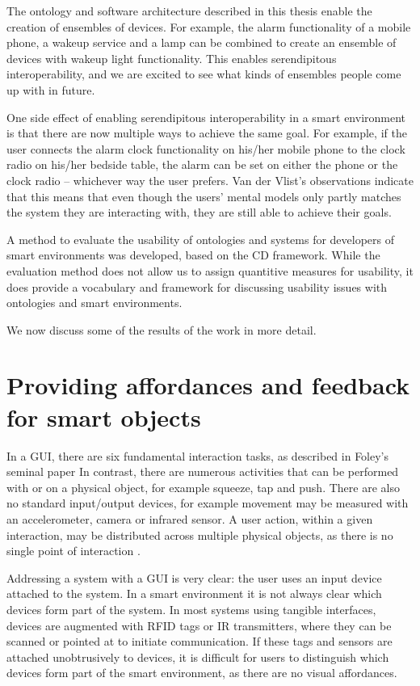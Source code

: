 The ontology and software architecture described in this thesis enable the creation of ensembles of devices. For example, the alarm functionality of a mobile phone, a wakeup service and a lamp can be combined to create an ensemble of devices with wakeup light functionality. This enables serendipitous interoperability, and we are excited to see what kinds of ensembles people come up with in future.

One side effect of enabling serendipitous interoperability in a smart environment is that there are now multiple ways to achieve the same goal. For example, if the user connects the alarm clock functionality on his/her mobile phone to the clock radio on his/her bedside table, the alarm can be set on either the phone or the clock radio -- whichever way the user prefers. Van der Vlist's \cite{Bram} observations indicate that this means that even though the users' mental models only partly matches the system they are interacting with, they are still able to achieve their goals.

A method to evaluate the usability of ontologies and systems for developers of smart environments was developed, based on the \ac{CD} framework. While the evaluation method does not allow us to assign quantitive measures for usability, it does provide a vocabulary and framework for discussing usability issues with ontologies and smart environments.%

We now discuss some of the results of the work in more detail.

\section{Providing affordances and feedback for smart objects}

In a \ac{GUI}, there are six fundamental interaction tasks, as described in Foley's seminal paper \cite{Foley1984} In contrast, there are numerous activities that can be performed with or on a physical object, for example squeeze, tap and push. There are also no standard input/output devices, for example movement may be measured with an accelerometer, camera or infrared sensor. A user action, within a given interaction, may be distributed across multiple physical objects, as there is no single point of interaction \cite{Dourish2004}. 

 Addressing a system with a \ac{GUI} is very clear: the user uses an input device attached to the system. In a smart environment it is not always clear which devices form part of the system. In most systems using tangible interfaces, devices are augmented with \ac{RFID} tags or IR transmitters, where they can be scanned or pointed at to initiate communication. If these tags and sensors are attached unobtrusively to devices, it is difficult for users to distinguish which devices form part of the smart environment, as there are no visual affordances. 
	
